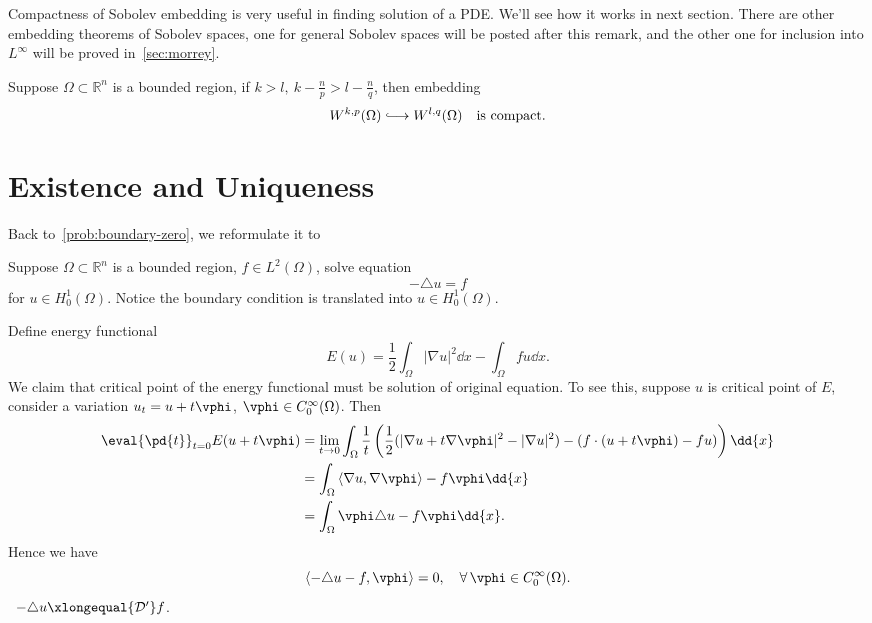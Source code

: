 \documentclass[UTF8,12pt]{article}
\numberwithin{theorem}{section}
\numberwithin{equation}{section}
\newcommand{\hooklongrightarrow}{\lhook\joinrel\longrightarrow}
\begin{document}
\begin{remark}
    Compactness of Sobolev embedding is very useful in finding solution of a PDE.
    We'll see how it works in next section. There are other embedding theorems
    of Sobolev spaces, one for general Sobolev spaces will be posted after this
    remark, and the other one for inclusion into \(L^\infty\) will be proved
    in~\cref{sec:morrey}.
\end{remark}

\begin{theorem}[Kondrachov]\hfill\par
    Suppose \(\Omega\subset \mathbb{R}^n\) is a bounded region,
    if \(k>l,\ k-\frac{n}{p}>l-\frac{n}{q}\), then embedding \[
        W^{k,p}(\Omega)\hooklongrightarrow W^{l,q}(\Omega)
        \quad\text{is compact.}
    \]
\end{theorem}

\section{Existence and Uniqueness}
Back to~\cref{prob:boundary-zero}, we reformulate it to
\begin{problem}\label{prob:h01}
    Suppose \(\Omega\subset \mathbb{R}^n\) is a bounded region, \(f\in L^2(\Omega)\),
    solve equation \[
        -\triangle u=f
    \] for \(u\in H_0^1(\Omega)\). Notice the boundary condition is translated into
    \(u\in H_0^1(\Omega)\).
\end{problem}

Define energy functional \[
    E(u)=\frac{1}{2}\int_{\Omega}|\nabla u|^2\dd{x}-\int_{\Omega}fu\dd{x}
.\] We claim that critical point of the energy functional must be solution
of original equation. To see this, suppose \(u\) is critical point of \(E\),
consider a variation \(u_t=u+t\vphi\), \(\vphi\in C_0^\infty(\Omega)\). Then
\begin{align*}
    \eval{\pd{t}}_{t=0}E(u+t\vphi)
    &=\lim_{t\to 0}\int_{\Omega}\frac{1}{t}
    \left(\frac{1}{2}(|\nabla u+t\nabla\vphi|^2-|\nabla u|^2)
    -(f\cdot (u+t\vphi)-fu)\right)\dd{x} \\
    &=\int_{\Omega}\left<\nabla u,\nabla\vphi\right>-f\vphi\dd{x} \\
    &=\int_{\Omega}\vphi\triangle u-f\vphi\dd{x}
.\end{align*}
Hence we have \[
    \left<-\triangle u-f,\vphi \right> =0,\quad
    \forall\,\vphi\in C_0^\infty(\Omega)
.\] \ie\ \(-\triangle u\xlongequal{\mathcal{D}'}f\).
\end{document}

